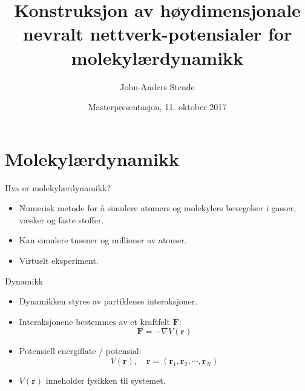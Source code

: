 \documentclass{beamer}
\title{Konstruksjon av høydimensjonale nevralt nettverk-potensialer for molekylærdynamikk}
\author{John-Anders Stende}
\institute{
  Fysisk institutt \\
  Universitetet i Oslo
}
\date{Masterpresentasjon, 11. oktober 2017}
\begin{document}
\frame{\titlepage}

\begin{frame}

\tableofcontents

\end{frame}


\section{Molekylærdynamikk}


\begin{frame}

\begin{block}{Hva er molekylærdynamikk?}
  \begin{itemize}
  \item Numerisk metode for å simulere atomers og molekylers bevegelser i gasser, væsker og faste stoffer.
  \item Kan simulere tusener og millioner av atomer. 
  \item Virtuelt eksperiment.
  \end{itemize}
\end{block}

\end{frame}


\begin{frame}

\begin{block}{Dynamikk}
  \begin{itemize}
  \item Dynamikken styres av partiklenes interaksjoner. 
  \item Interaksjonene bestemmes av et kraftfelt $\mathbf{F}$:
    \begin{equation*}
    \mathbf{F} = -\nabla V(\mathbf{r})
    \end{equation*}
  \item Potensiell energiflate / potensial:
    \begin{equation*}
      V(\mathbf{r}), \quad \mathbf{r} = (\mathbf{r}_1, \mathbf{r}_2, \cdots, \mathbf{r}_N)
    \end{equation*}
  \item $V(\mathbf{r})$ inneholder fysikken til systemet. 
  \end{itemize}
\end{block}

\end{frame}
\end{document}
